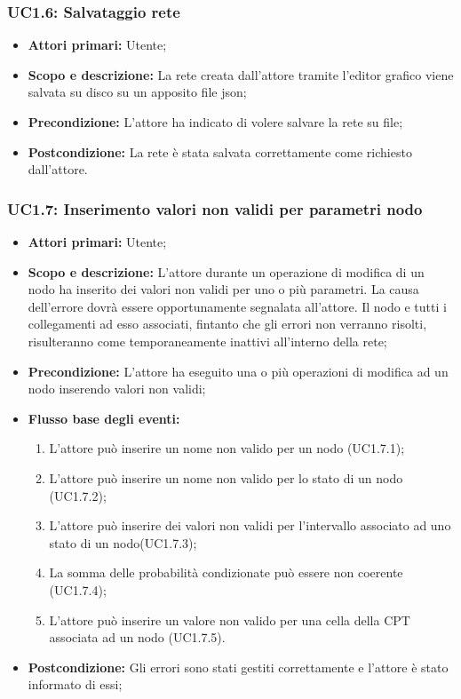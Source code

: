 \subsubsection{UC1.6: Salvataggio rete} 
\begin{itemize} 
	\item{\textbf{Attori primari:} Utente;} 
	\item{\textbf{Scopo e descrizione:} La rete creata dall'attore tramite l'editor grafico viene salvata su disco su un apposito file json;} 
	\item{\textbf{Precondizione:} L'attore ha indicato di volere salvare la rete su file;} 
	\item{\textbf{Postcondizione:} La rete è stata salvata correttamente come richiesto dall'attore.} 
\end{itemize} 
\subsubsection{UC1.7: Inserimento valori non validi per parametri nodo} 
\begin{itemize} 
	\item{\textbf{Attori primari:} Utente;} 
	\item{\textbf{Scopo e descrizione:} L'attore durante un operazione di modifica di un nodo ha inserito dei valori non validi per uno o più parametri. La causa dell'errore dovrà essere opportunamente segnalata all'attore. Il nodo e tutti i collegamenti ad esso associati, fintanto che gli errori non verranno risolti, risulteranno come temporaneamente inattivi all'interno della rete;} 
	\item{\textbf{Precondizione:} L'attore ha eseguito una o più operazioni di modifica ad un nodo inserendo valori non validi;} 
	\item{\textbf{Flusso base degli eventi:} } 
	\begin{enumerate} 
	\item{L'attore può inserire un nome non valido per un nodo (UC1.7.1);} 
	\item{L'attore può inserire un nome non valido per lo stato di un nodo (UC1.7.2);} 
	\item{L'attore può inserire dei valori non validi per l'intervallo associato ad uno stato di un nodo(UC1.7.3);} 
	\item{La somma delle probabilità condizionate può essere non coerente (UC1.7.4);} 
	\item{L'attore può inserire un valore non valido per una cella della CPT associata ad un nodo (UC1.7.5).} 
	\end{enumerate} 
	\item{\textbf{Postcondizione:} Gli errori sono stati gestiti correttamente e l'attore è stato informato di essi;} 
\end{itemize} 
